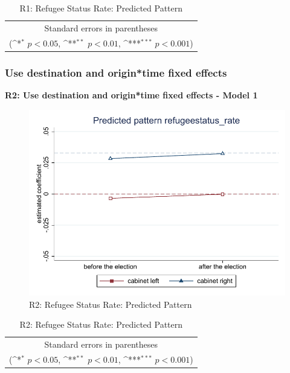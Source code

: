 \documentclass[10pt,a4paper]{scrartcl}
\begin{document}
\begin{table}[!ht]\centering
	\footnotesize
	\renewcommand{\arraystretch}{1.2}
	\def\sym#1{\ifmmode^{#1}\else\(^{#1}\)\fi}
	\caption{R1: Refugee Status Rate: Predicted Pattern}
	\begin{tabular}{l*{2}{c}}
		\hline\hline
		
		\hline\hline
		\multicolumn{3}{c}{\footnotesize Standard errors in parentheses} \\
		\multicolumn{3}{c}{\footnotesize (\sym{*} \(p<0.05\), \sym{**} \(p<0.01\), \sym{***} \(p<0.001\))}\\
	\end{tabular}
\end{table}


\FloatBarrier
\clearpage
\subsubsection{Use destination and origin*time fixed effects}
\textbf{R2: Use destination and origin*time fixed effects - Model 1}

\begin{figure}[!ht]
	\centering
	\includegraphics[width=1\textwidth]{figures_edited/refugeestatus_rate_graph1_R2.pdf}
	\caption{R2: Refugee Status Rate: Predicted Pattern}
\end{figure}

\begin{table}[!ht]\centering
	\renewcommand{\arraystretch}{1.25}
	\def\sym#1{\ifmmode^{#1}\else\(^{#1}\)\fi}
	\caption{R2: Refugee Status Rate: Predicted Pattern}
	\begin{tabular}{l*{2}{c}}
		\hline\hline
		
		\hline\hline
		\multicolumn{3}{c}{\footnotesize Standard errors in parentheses} \\
		\multicolumn{3}{c}{\footnotesize (\sym{*} \(p<0.05\), \sym{**} \(p<0.01\), \sym{***} \(p<0.001\))}\\
	\end{tabular}
\end{table}
\end{document}
